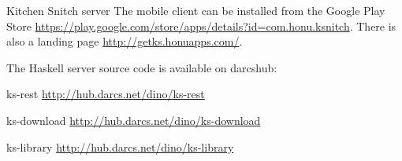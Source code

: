 \documentclass[DIV16,twocolumn,10pt]{scrreprt}
\begin{document}
\begin{hcarentry}{Kitchen Snitch server}
The mobile client can be installed from the Google Play Store \url{https://play.google.com/store/apps/details?id=com.honu.ksnitch}. There is also a landing page \url{http://getks.honuapps.com/}.

The Haskell server source code is available on darcshub:

\begin{kssrc}
 \item ks-rest \url{http://hub.darcs.net/dino/ks-rest}
 \item ks-download \url{http://hub.darcs.net/dino/ks-download}
 \item ks-library \url{http://hub.darcs.net/dino/ks-library}
\end{kssrc}

\end{hcarentry}
\end{document}
